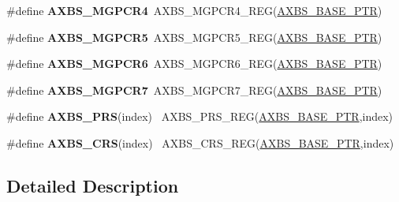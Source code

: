 \begin{DoxyCompactItemize}
\item 
\hypertarget{group___a_x_b_s___register___accessor___macros_gae3f8cd76e1859270c547ecbd1c30f079}{}\#define {\bfseries A\+X\+B\+S\+\_\+\+M\+G\+P\+C\+R4}~A\+X\+B\+S\+\_\+\+M\+G\+P\+C\+R4\+\_\+\+R\+E\+G(\hyperlink{group___a_x_b_s___peripheral_gacbbf56489b86d1ddb3e0ac291922a56d}{A\+X\+B\+S\+\_\+\+B\+A\+S\+E\+\_\+\+P\+T\+R})\label{group___a_x_b_s___register___accessor___macros_gae3f8cd76e1859270c547ecbd1c30f079}

\item 
\hypertarget{group___a_x_b_s___register___accessor___macros_gac7bb0cca5fc0f31eb9842e7fd07cb1e4}{}\#define {\bfseries A\+X\+B\+S\+\_\+\+M\+G\+P\+C\+R5}~A\+X\+B\+S\+\_\+\+M\+G\+P\+C\+R5\+\_\+\+R\+E\+G(\hyperlink{group___a_x_b_s___peripheral_gacbbf56489b86d1ddb3e0ac291922a56d}{A\+X\+B\+S\+\_\+\+B\+A\+S\+E\+\_\+\+P\+T\+R})\label{group___a_x_b_s___register___accessor___macros_gac7bb0cca5fc0f31eb9842e7fd07cb1e4}

\item 
\hypertarget{group___a_x_b_s___register___accessor___macros_ga92178aaf2d673da7dca66088fe1065d1}{}\#define {\bfseries A\+X\+B\+S\+\_\+\+M\+G\+P\+C\+R6}~A\+X\+B\+S\+\_\+\+M\+G\+P\+C\+R6\+\_\+\+R\+E\+G(\hyperlink{group___a_x_b_s___peripheral_gacbbf56489b86d1ddb3e0ac291922a56d}{A\+X\+B\+S\+\_\+\+B\+A\+S\+E\+\_\+\+P\+T\+R})\label{group___a_x_b_s___register___accessor___macros_ga92178aaf2d673da7dca66088fe1065d1}

\item 
\hypertarget{group___a_x_b_s___register___accessor___macros_ga48c2d3405ef402f1c44690d7582cb0a8}{}\#define {\bfseries A\+X\+B\+S\+\_\+\+M\+G\+P\+C\+R7}~A\+X\+B\+S\+\_\+\+M\+G\+P\+C\+R7\+\_\+\+R\+E\+G(\hyperlink{group___a_x_b_s___peripheral_gacbbf56489b86d1ddb3e0ac291922a56d}{A\+X\+B\+S\+\_\+\+B\+A\+S\+E\+\_\+\+P\+T\+R})\label{group___a_x_b_s___register___accessor___macros_ga48c2d3405ef402f1c44690d7582cb0a8}

\item 
\hypertarget{group___a_x_b_s___register___accessor___macros_ga62bcd3b1a0e6baa9daf5bfb57430422b}{}\#define {\bfseries A\+X\+B\+S\+\_\+\+P\+R\+S}(index)                                                ~A\+X\+B\+S\+\_\+\+P\+R\+S\+\_\+\+R\+E\+G(\hyperlink{group___a_x_b_s___peripheral_gacbbf56489b86d1ddb3e0ac291922a56d}{A\+X\+B\+S\+\_\+\+B\+A\+S\+E\+\_\+\+P\+T\+R},index)\label{group___a_x_b_s___register___accessor___macros_ga62bcd3b1a0e6baa9daf5bfb57430422b}

\item 
\hypertarget{group___a_x_b_s___register___accessor___macros_ga4a8510c9fc2b213af3b61317c78f3252}{}\#define {\bfseries A\+X\+B\+S\+\_\+\+C\+R\+S}(index)                                                ~A\+X\+B\+S\+\_\+\+C\+R\+S\+\_\+\+R\+E\+G(\hyperlink{group___a_x_b_s___peripheral_gacbbf56489b86d1ddb3e0ac291922a56d}{A\+X\+B\+S\+\_\+\+B\+A\+S\+E\+\_\+\+P\+T\+R},index)\label{group___a_x_b_s___register___accessor___macros_ga4a8510c9fc2b213af3b61317c78f3252}

\end{DoxyCompactItemize}


\subsection{Detailed Description}
